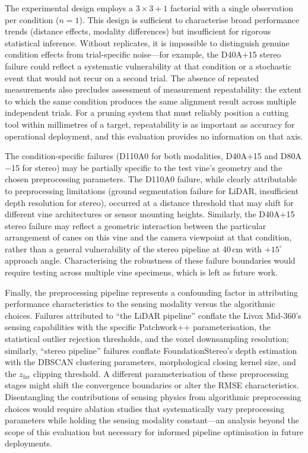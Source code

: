 The experimental design employs a $3 \times 3 + 1$ factorial with a single observation per condition ($n = 1$). This design is sufficient to characterise broad performance trends (distance effects, modality differences) but insufficient for rigorous statistical inference. Without replicates, it is impossible to distinguish genuine condition effects from trial-specific noise---for example, the D40A$+$15 stereo failure could reflect a systematic vulnerability at that condition or a stochastic event that would not recur on a second trial. The absence of repeated measurements also precludes assessment of measurement repeatability: the extent to which the same condition produces the same alignment result across multiple independent trials. For a pruning system that must reliably position a cutting tool within millimetres of a target, repeatability is as important as accuracy for operational deployment, and this evaluation provides no information on that axis.

The condition-specific failures (D110A0 for both modalities, D40A$+$15 and D80A$-$15 for stereo) may be partially specific to the test vine's geometry and the chosen preprocessing parameters. The D110A0 failure, while clearly attributable to preprocessing limitations (ground segmentation failure for LiDAR, insufficient depth resolution for stereo), occurred at a distance threshold that may shift for different vine architectures or sensor mounting heights. Similarly, the D40A$+$15 stereo failure may reflect a geometric interaction between the particular arrangement of canes on this vine and the camera viewpoint at that condition, rather than a general vulnerability of the stereo pipeline at 40\,cm with $+15^{\circ}$ approach angle. Characterising the robustness of these failure boundaries would require testing across multiple vine specimens, which is left as future work.

Finally, the preprocessing pipeline represents a confounding factor in attributing performance characteristics to the sensing modality versus the algorithmic choices. Failures attributed to ``the LiDAR pipeline'' conflate the Livox Mid-360's sensing capabilities with the specific Patchwork++ parameterisation, the statistical outlier rejection thresholds, and the voxel downsampling resolution; similarly, ``stereo pipeline'' failures conflate FoundationStereo's depth estimation with the DBSCAN clustering parameters, morphological closing kernel size, and the $z_\text{far}$ clipping threshold. A different parameterisation of these preprocessing stages might shift the convergence boundaries or alter the RMSE characteristics. Disentangling the contributions of sensing physics from algorithmic preprocessing choices would require ablation studies that systematically vary preprocessing parameters while holding the sensing modality constant---an analysis beyond the scope of this evaluation but necessary for informed pipeline optimisation in future deployments.
